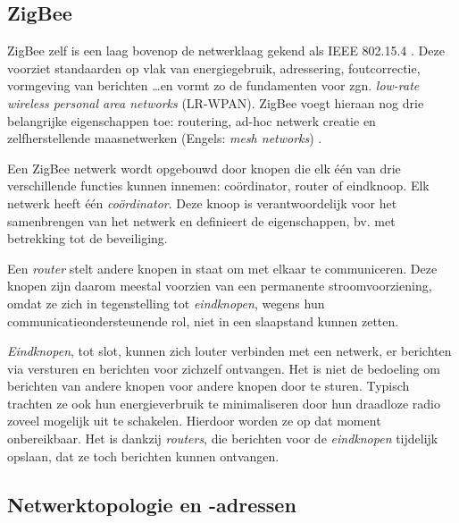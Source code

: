 \subsection{ZigBee}
\label{subsection:zigbee}

ZigBee zelf is een laag bovenop de netwerklaag gekend als IEEE 802.15.4
\citep{ieee2009802.15.4}. Deze voorziet standaarden op vlak van energiegebruik,
adressering, foutcorrectie, vormgeving van berichten \dots en vormt zo de
fundamenten voor zgn. \emph{low-rate wireless personal area networks}
(LR-WPAN). ZigBee voegt hieraan nog drie belangrijke eigenschappen toe:
routering, ad-hoc netwerk creatie en zelfherstellende maasnetwerken (Engels:
\emph{mesh networks}) \citep{oreilly2010buildingwsn}.

Een ZigBee netwerk wordt opgebouwd door knopen die elk \'e\'en van drie
verschillende functies kunnen innemen: co\"ordinator, router of eindknoop. Elk
netwerk heeft \'e\'en \emph{co\"ordinator}. Deze knoop is verantwoordelijk voor
het samenbrengen van het netwerk en definieert de eigenschappen, bv. met
betrekking tot de beveiliging.

Een \emph{router} stelt andere knopen in staat om met elkaar te communiceren.
Deze knopen zijn daarom meestal voorzien van een permanente stroomvoorziening,
omdat ze zich in tegenstelling tot \emph{eindknopen}, wegens hun
communicatieondersteunende rol, niet in een slaapstand kunnen zetten.

\emph{Eindknopen}, tot slot, kunnen zich louter verbinden met een netwerk, er
berichten via versturen en berichten voor zichzelf ontvangen. Het is niet de
bedoeling om berichten van andere knopen voor andere knopen door te sturen.
Typisch trachten ze ook hun energieverbruik te minimaliseren door hun draadloze
radio zoveel mogelijk uit te schakelen. Hierdoor worden ze op dat moment
onbereikbaar. Het is dankzij \emph{routers}, die berichten voor de
\emph{eindknopen} tijdelijk opslaan, dat ze toch berichten kunnen ontvangen.

\subsection{Netwerktopologie en -adressen}
\label{subsection:topologie}


